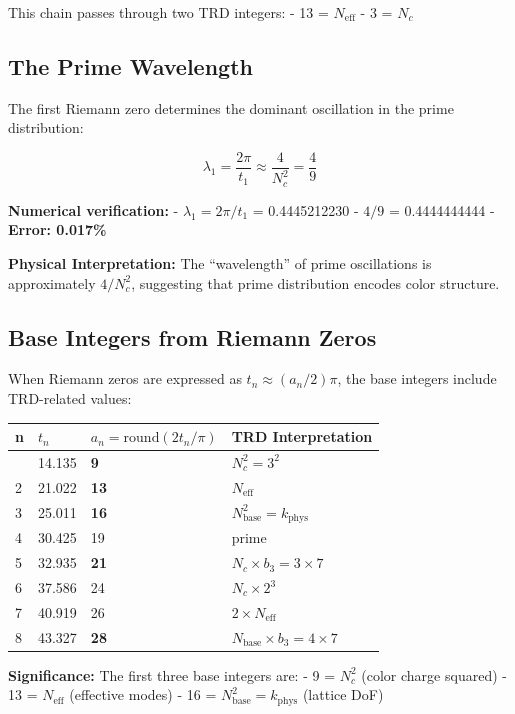 \documentclass[
  11pt,
  letterpaper,
  twoside,
  openright]{book}
\begin{document}
This chain passes through two TRD integers: - 13 = \(N_{\text{eff}}\) -
3 = \(N_c\)

\subsection{The Prime Wavelength}\label{the-prime-wavelength}

The first Riemann zero determines the dominant oscillation in the prime
distribution:

\[\lambda_1 = \frac{2\pi}{t_1} \approx \frac{4}{N_c^2} = \frac{4}{9}\]

\textbf{Numerical verification:} - \(\lambda_1 = 2\pi/t_1\) =
0.4445212230 - \(4/9\) = 0.4444444444 - \textbf{Error: 0.017\%}

\textbf{Physical Interpretation:} The ``wavelength'' of prime
oscillations is approximately \(4/N_c^2\), suggesting that prime
distribution encodes color structure.

\subsection{Base Integers from Riemann
Zeros}\label{base-integers-from-riemann-zeros}

When Riemann zeros are expressed as \(t_n \approx (a_n/2)\pi\), the base
integers include TRD-related values:

\begin{longtable}[]{@{}llll@{}}
\toprule\noalign{}
n & \(t_n\) & \(a_n = \text{round}(2t_n/\pi)\) & TRD Interpretation \\
\midrule\noalign{}
\endhead
\bottomrule\noalign{}
\endlastfoot
1 & 14.135 & \textbf{9} & \(N_c^2 = 3^2\) \\
2 & 21.022 & \textbf{13} & \(N_{\text{eff}}\) \\
3 & 25.011 & \textbf{16} & \(N_{\text{base}}^2 = k_{\text{phys}}\) \\
4 & 30.425 & 19 & prime \\
5 & 32.935 & \textbf{21} & \(N_c \times b_3 = 3 \times 7\) \\
6 & 37.586 & 24 & \(N_c \times 2^3\) \\
7 & 40.919 & 26 & \(2 \times N_{\text{eff}}\) \\
8 & 43.327 & \textbf{28} &
\(N_{\text{base}} \times b_3 = 4 \times 7\) \\
\end{longtable}

\textbf{Significance:} The first three base integers are: - 9 =
\(N_c^2\) (color charge squared) - 13 = \(N_{\text{eff}}\) (effective
modes) - 16 = \(N_{\text{base}}^2 = k_{\text{phys}}\) (lattice DoF)
\end{document}
